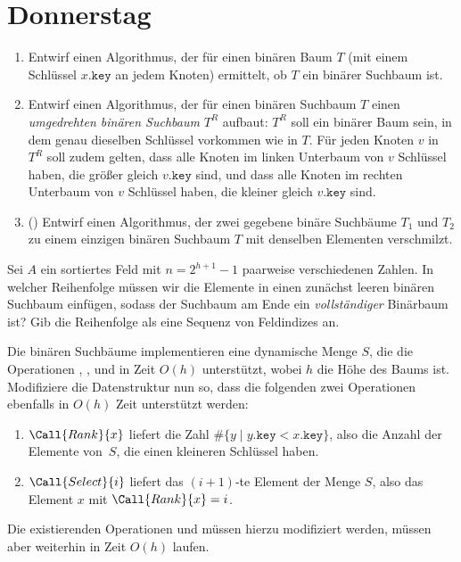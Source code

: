 \documentclass{uebung_cs}
\begin{document}
\section*{Donnerstag}
\begin{aufgabe}\mbox{}
	\begin{enumerate}
		\item Entwirf einen Algorithmus, der für einen binären Baum $T$ (mit einem Schlüssel $x.\texttt{key}$ an jedem Knoten) ermittelt, ob $T$ ein binärer Suchbaum ist.
		\item Entwirf einen Algorithmus, der für einen binären Suchbaum $T$ einen \textit{umgedrehten binären Suchbaum} $T^R$ aufbaut:
		$T^R$ soll ein binärer Baum sein, in dem genau dieselben Schlüssel vorkommen wie in $T$.
		Für jeden Knoten $v$ in $T^R$ soll zudem gelten, dass alle Knoten im linken Unterbaum von $v$ Schlüssel haben, die größer gleich $v.\texttt{key}$ sind, und dass alle Knoten im rechten Unterbaum von $v$ Schlüssel haben, die kleiner gleich $v.\texttt{key}$ sind.
		\item (\hard) Entwirf einen Algorithmus, der zwei gegebene binäre Suchbäume $T_1$ und $T_2$ zu einem einzigen binären Suchbaum $T$ mit denselben Elementen verschmilzt.
	\end{enumerate}
\end{aufgabe}

\begin{aufgabe}
	Sei $A$ ein sortiertes Feld mit $n = 2^{h+1}-1$ paarweise verschiedenen Zahlen.
	In welcher Reihenfolge müssen wir die Elemente in einen zunächst leeren binären Suchbaum einfügen, sodass der Suchbaum am Ende ein \emph{vollständiger} Binärbaum ist?
	Gib die Reihenfolge als eine Sequenz von Feldindizes an.
\end{aufgabe}

\begin{aufgabe}
	Die binären Suchbäume implementieren eine dynamische Menge $S$, die die Operationen , ,  und  in Zeit $O(h)$ unterstützt, wobei $h$ die Höhe des Baums ist.
	Modifiziere die Datenstruktur nun so, dass die folgenden zwei Operationen ebenfalls in $O(h)$ Zeit unterstützt werden:
	\begin{enumerate}
		\item $\Call{Rank}{x}$ liefert die Zahl $\#\{y\;|\;y.\texttt{key} < x.\texttt{key}\}$, also die Anzahl der Elemente von~$S$, die einen kleineren Schlüssel haben.
		\item $\Call{Select}{i}$ liefert das $(i+1)$-te Element der Menge $S$, also das Element $x$ mit $\Call{Rank}{x}=i$.
	\end{enumerate}
	Die existierenden Operationen  und  müssen hierzu modifiziert werden, müssen aber weiterhin in Zeit $O(h)$ laufen.
\end{aufgabe}
\end{document}
